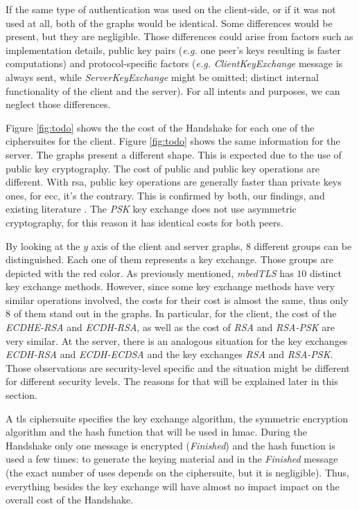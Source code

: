 \documentclass{llncs}
\begin{document}
If the same type of authentication
was used on the client-side, or if it was not used at all, both of the graphs would be identical. Some differences would be present,
but they are negligible. Those differences could arise from factors such as implementation details, public key pairs (\textit{e.g.}
one peer's keys resulting is faster computations) and protocol-specific factors (\textit{e.g.} \textit{ClientKeyExchange}
message is always sent, while \textit{ServerKeyExchange} might be omitted; distinct internal functionality of the client 
and the server). For all intents and purposes, we can neglect those differences.

Figure \ref{fig:todo} shows the the cost of the Handshake for each one of the ciphersuites for the client. Figure
\ref{fig:todo} shows the same information for the server. The graphs present a different shape. This is expected due 
to the use of public key cryptography. The cost of public and public key operations are different. With \gls{rsa},
public key operations are generally faster than private keys ones, for \gls{ecc}, it's the contrary. This is confirmed
by both, our findings, and existing literature \cite{maletsky2015rsa}. The \textit{PSK} key exchange does not
use asymmetric cryptography, for this reason it has identical costs for both peers.

By looking at the $y$ axis of the client and server graphs, $8$ different groups can be distinguished. Each one of them 
represents a key exchange. Those groups are depicted with the red color.  As previously mentioned, \textit{mbedTLS} has 
$10$ distinct key exchange methods. However, since some key exchange methods have very similar operations involved,
the costs for their cost is almost the same, thus only $8$ of them stand out in the graphs. In particular,
for the client, the cost of the \textit{ECDHE-RSA} and \textit{ECDH-RSA}, as well as the cost of \textit{RSA} and \textit{RSA-PSK}
are very similar. At the server, there is an analogous situation for the key exchanges \textit{ECDH-RSA} and \textit{ECDH-ECDSA}
and the key exchanges \textit{RSA} and \textit{RSA-PSK}. Those observations are security-level specific and the situation
might be different for different security levels. The reasons for that will be explained later in this section.

A \gls{tls} ciphersuite specifies the key exchange algorithm, the symmetric encryption algorithm and the hash function
that will be used in \gls{hmac}. During the Handshake only one message is encrypted (\textit{Finished}) and the hash function
is used a few times: to generate the keying material and in the \textit{Finished} message (the exact number of uses
depends on the ciphersuite, but it is negligible). Thus, everything besides the key exchange will have almost no impact
impact on the overall cost of the Handshake.
\end{document}
